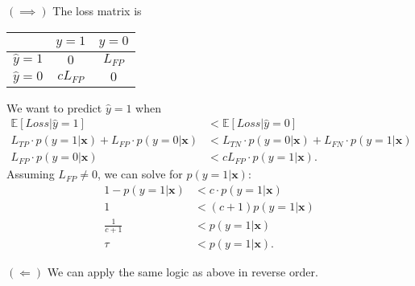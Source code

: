 \documentclass[a4paper,11pt]{article}
\begin{document}
\noindent $(\implies)$ The loss matrix is
\begin{center}\begin{tabular}{c|c|c}
       & $y=1$ & $y=0$ \\
       \hline
       $\hat{y}=1$ & $0$ & $L_{FP}$\\
       \hline
       $\hat{y}=0$ &$cL_{FP}$ & $0$ \\
\end{tabular} \end{center}
We want to predict $\hat{y}=1$ when
\begin{align*}
    \mathbb{E}[Loss|\hat{y}=1] & < \mathbb{E}[Loss|\hat{y}=0]  \\
    L_{TP}\cdot p(y=1|\mathbf{x}) + L_{FP}\cdot p(y=0|\mathbf{x})
    & < L_{TN}\cdot p(y=0|\mathbf{x})
    + L_{FN}\cdot p(y=1|\mathbf{x}) \\
    L_{FP}\cdot p(y=0|\mathbf{x}) &<
    cL_{FP}\cdot p(y=1|\mathbf{x}).
\end{align*}
Assuming $L_{FP}\neq 0$, we can solve for $p(y=1|\mathbf{x})$:
\begin{align*}
    1-p(y=1| \mathbf{x}) &< c\cdot p(y=1|\mathbf{x}) \\
    1 &< (c+1)p(y=1|\mathbf{x}) \\
    \frac{1}{c+1} &< p(y=1|\mathbf{x}) \\
    \tau &< p(y=1|\mathbf{x}).
\end{align*}

\noindent $(\Longleftarrow)$ We can apply the same logic as above in reverse order.
\end{document}
